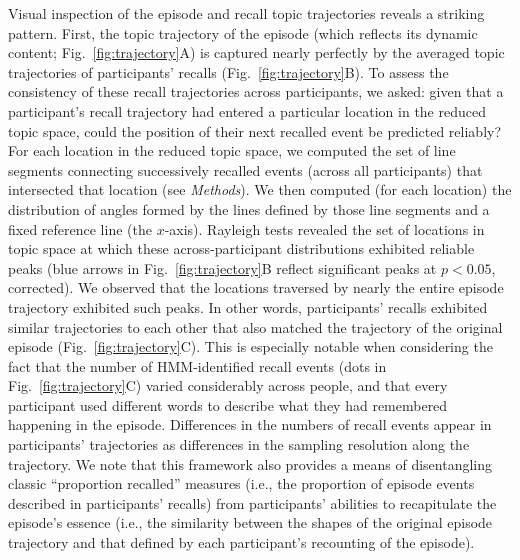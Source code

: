 \documentclass[10pt]{article}
\begin{document}
Visual inspection of the episode and recall topic trajectories reveals a striking pattern.  First, the topic trajectory of the episode (which reflects its dynamic content; Fig.~\ref{fig:trajectory}A) is captured nearly perfectly by the averaged topic trajectories of participants' recalls (Fig.~\ref{fig:trajectory}B).  To assess the consistency of these recall trajectories across participants, we asked: given that a participant's recall trajectory had entered a particular location in the reduced topic space, could the position of their next recalled event be predicted reliably?  For each location in the reduced topic space, we computed the set of line segments connecting successively recalled events (across all participants) that intersected that location (see \textit{Methods}).  We then computed (for each location) the distribution of angles formed by the lines defined by those line segments and a fixed reference line (the $x$-axis).  Rayleigh tests revealed the set of locations in topic space at which these across-participant distributions exhibited reliable peaks (blue arrows in Fig.~\ref{fig:trajectory}B reflect significant peaks at $p < 0.05$, corrected).  We observed that the locations traversed by nearly the entire episode trajectory exhibited such peaks.  In other words, participants' recalls exhibited similar trajectories to each other that also matched the trajectory of the original episode (Fig.~\ref{fig:trajectory}C).  This is especially notable when considering the fact that the number of HMM-identified recall events (dots in Fig.~\ref{fig:trajectory}C) varied considerably across people, and that every participant used different words to describe what they had remembered happening in the episode.  Differences in the numbers of recall events appear in participants' trajectories as differences in the sampling resolution along the trajectory.  We note that this framework also provides a means of disentangling classic ``proportion recalled'' measures (i.e., the proportion of episode events described in participants' recalls) from participants' abilities to recapitulate the episode's essence (i.e., the similarity between the shapes of the original episode trajectory and that defined by each participant's recounting of the episode).
\end{document}
